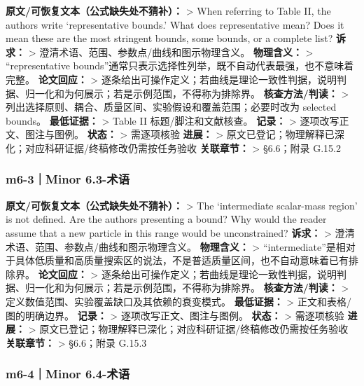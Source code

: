 \documentclass[
  chinese,
  UTF8]{ctexart}
\begin{document}
\textbf{原文/可恢复文本（公式缺失处不猜补）：} \textgreater{} When
referring to Table II, the authors write `representative bounds.' What
does representative mean? Does it mean these are the most stringent
bounds, some bounds, or a complete list? \textbf{诉求：} \textgreater{}
澄清术语、范围、参数点/曲线和图示物理含义。 \textbf{物理含义：}
\textgreater{} ``representative
bounds''通常只表示选择性列举，既不自动代表最强，也不意味着完整。
\textbf{论文回应：} \textgreater{}
逐条给出可操作定义；若曲线是理论一致性判据，说明判据、归一化和为何展示；若是示例范围，不得称为排除界。
\textbf{核查方法/判读：} \textgreater{}
列出选择原则、耦合、质量区间、实验假设和覆盖范围；必要时改为 selected
bounds。 \textbf{最低证据：} \textgreater{} Table II
标题/脚注和文献核查。 \textbf{记录：} \textgreater{}
逐项改写正文、图注与图例。 \textbf{状态：} \textgreater{} 需逐项核验
\textbf{进展：} \textgreater{}
原文已登记；物理解释已深化；对应科研证据/终稿修改仍需按任务验收
\textbf{关联章节：} \textgreater{} §6.6；附录 G.15.2

\subsubsection{m6-3｜Minor 6.3-术语}\label{m6-3minor-6.3-ux672fux8bed}

\textbf{原文/可恢复文本（公式缺失处不猜补）：} \textgreater{} The
`intermediate scalar-mass region' is not defined. Are the authors
presenting a bound? Why would the reader assume that a new particle in
this range would be unconstrained? \textbf{诉求：} \textgreater{}
澄清术语、范围、参数点/曲线和图示物理含义。 \textbf{物理含义：}
\textgreater{}
``intermediate''是相对于具体低质量和高质量搜索区的说法，不是普适质量区间，也不自动意味着已有排除界。
\textbf{论文回应：} \textgreater{}
逐条给出可操作定义；若曲线是理论一致性判据，说明判据、归一化和为何展示；若是示例范围，不得称为排除界。
\textbf{核查方法/判读：} \textgreater{}
定义数值范围、实验覆盖缺口及其依赖的衰变模式。 \textbf{最低证据：}
\textgreater{} 正文和表格/图的明确边界。 \textbf{记录：} \textgreater{}
逐项改写正文、图注与图例。 \textbf{状态：} \textgreater{} 需逐项核验
\textbf{进展：} \textgreater{}
原文已登记；物理解释已深化；对应科研证据/终稿修改仍需按任务验收
\textbf{关联章节：} \textgreater{} §6.6；附录 G.15.3

\subsubsection{m6-4｜Minor 6.4-术语}\label{m6-4minor-6.4-ux672fux8bed}
\end{document}
